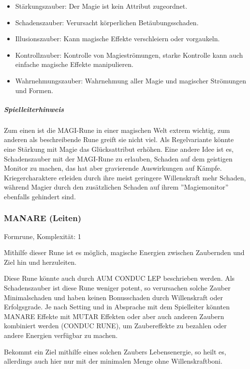 \documentclass{article}
\begin{document}
\begin{itemize}
\item Stärkungszauber: Der Magie ist kein Attribut zugeordnet.
\item Schadenszauber: Verursacht körperlichen Betäubungsschaden.
\item Illusionszauber: Kann magische Effekte verschleiern oder vorgaukeln.
\item Kontrollzauber: Kontrolle von Magieströmungen, starke Kontrolle kann auch einfache magische Effekte manipulieren.
\item Wahrnehmungszauber: Wahrnehmung aller Magie und magischer Strömungen und Formen.
\end{itemize}

\begin{mdframed}[hidealllines=true, backgroundcolor=black!10]
\subparagraph{Spielleiterhinweis}

Zum einen ist die MAGI-Rune in einer magischen Welt extrem wichtig, zum anderen als beschreibende Rune greift sie
nicht viel. Als Regelvariante könnte eine Stärkung mit Magie das Glücksattribut erhöhen. Eine andere Idee ist es,
Schadenszauber mit der MAGI-Rune zu erlauben, Schaden auf dem geistigen Monitor zu machen, das hat aber gravierende
Auswirkungen auf Kämpfe. Kriegercharaktere erleiden durch ihre meist geringere Willenskraft mehr Schaden, während
Magier durch den zusätzlichen Schaden auf ihrem ''Magiemonitor'' ebenfalls gehindert sind.

\end{mdframed}
\subsubsection{MANARE (Leiten)}

Formrune, Komplexität: 1

Mithilfe dieser Rune ist es möglich, magische Energien zwischen Zaubernden und Ziel hin und herzuleiten.

Diese Rune könnte auch durch AUM CONDUC LEP beschrieben werden. Als Schadenszauber ist diese Rune weniger potent, so
verursachen solche Zauber Minimalschaden und haben keinen Bonusschaden durch Willenskraft oder Erfolgsgrade. Je nach
Setting und in Absprache mit dem Spielleiter könnten MANARE Effekte mit MUTAR Effekten oder aber auch anderen
Zaubern kombiniert werden (CONDUC RUNE), um Zaubereffekte zu bezahlen oder andere Energien verfügbar zu machen.

Bekommt ein Ziel mithilfe eines solchen Zaubers Lebensenergie, so heilt es, allerdings auch hier nur mit der
minimalen Menge ohne Willenskraftboni.
\end{document}
